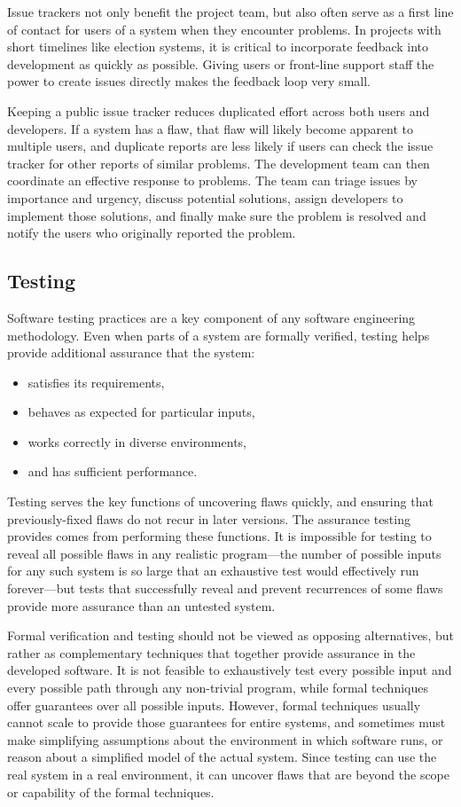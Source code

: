 Issue trackers not only benefit the project team, but also often serve
as a first line of contact for users of a system when they encounter
problems. In projects with short timelines like election systems, it
is critical to incorporate feedback into development as quickly as
possible. Giving users or front-line support staff the power to create
issues directly makes the feedback loop very small.

Keeping a public issue tracker reduces duplicated effort across both
users and developers. If a system has a flaw, that flaw will likely
become apparent to multiple users, and duplicate reports are less
likely if users can check the issue tracker for other reports of
similar problems. The development team can then coordinate an
effective response to problems. The team can triage issues by
importance and urgency, discuss potential solutions, assign developers
to implement those solutions, and finally make sure the problem is
resolved and notify the users who originally reported the problem.

\subsection{Testing}

Software testing practices are a key component of any software
engineering methodology. Even when parts of a system are formally
verified, testing helps provide additional assurance that the system:

\begin{itemize}
\item satisfies its requirements,
\item behaves as expected for particular inputs,
\item works correctly in diverse environments,
\item and has sufficient performance.
\end{itemize}

Testing serves the key functions of uncovering flaws quickly, and
ensuring that previously-fixed flaws do not recur in later
versions. The assurance testing provides comes from performing these
functions. It is impossible for testing to reveal all possible flaws
in any realistic program---the number of possible inputs for any such
system is so large that an exhaustive test would effectively run
forever---but tests that successfully reveal and prevent recurrences
of some flaws provide more assurance than an untested system.

Formal verification and testing should not be viewed as opposing
alternatives, but rather as complementary techniques that together
provide assurance in the developed software. It is not feasible to
exhaustively test every possible input and every possible path through
any non-trivial program, while formal techniques offer guarantees over
all possible inputs. However, formal techniques usually cannot scale
to provide those guarantees for entire systems, and sometimes must
make simplifying assumptions about the environment in which software
runs, or reason about a simplified model of the actual system. Since
testing can use the real system in a real environment, it can uncover
flaws that are beyond the scope or capability of the formal
techniques.

